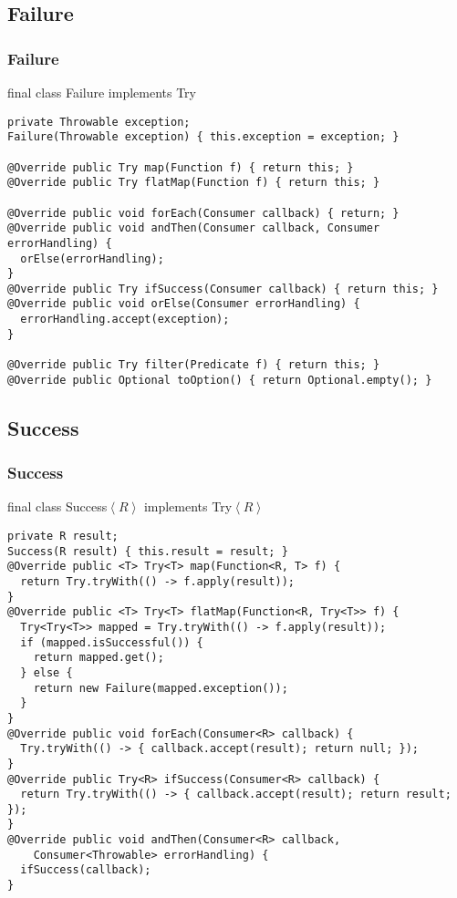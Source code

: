 \documentclass{beamer}
\begin{document}
\subsection{Failure}
\begin{frame}[fragile]
  \frametitle{Failure}
  final class Failure implements Try
  \scriptsize{
  \begin{verbatim}
private Throwable exception;
Failure(Throwable exception) { this.exception = exception; }

@Override public Try map(Function f) { return this; }
@Override public Try flatMap(Function f) { return this; }

@Override public void forEach(Consumer callback) { return; }
@Override public void andThen(Consumer callback, Consumer errorHandling) {
  orElse(errorHandling);
}
@Override public Try ifSuccess(Consumer callback) { return this; }
@Override public void orElse(Consumer errorHandling) {
  errorHandling.accept(exception);
}

@Override public Try filter(Predicate f) { return this; }
@Override public Optional toOption() { return Optional.empty(); }   
  \end{verbatim}
  }
\end{frame}

\subsection{Success}
\begin{frame}[fragile]
  \frametitle{Success}
  final class Success$\left<R \right>$ implements Try$\left<R \right>$
  \scriptsize{
  \begin{verbatim}
private R result;
Success(R result) { this.result = result; }
@Override public <T> Try<T> map(Function<R, T> f) {
  return Try.tryWith(() -> f.apply(result));
}
@Override public <T> Try<T> flatMap(Function<R, Try<T>> f) {
  Try<Try<T>> mapped = Try.tryWith(() -> f.apply(result));
  if (mapped.isSuccessful()) {
    return mapped.get();
  } else {
    return new Failure(mapped.exception());
  }
}
@Override public void forEach(Consumer<R> callback) {
  Try.tryWith(() -> { callback.accept(result); return null; });
}
@Override public Try<R> ifSuccess(Consumer<R> callback) {
  return Try.tryWith(() -> { callback.accept(result); return result; });
}
@Override public void andThen(Consumer<R> callback, 
    Consumer<Throwable> errorHandling) {
  ifSuccess(callback);
}
  \end{verbatim}
  }
\end{frame}
\end{document}
